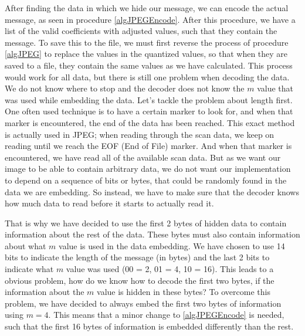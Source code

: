 After finding the data in which we hide our message, we can encode the actual message, as seen in procedure \ref{algJPEGEncode}. 
After this procedure, we have a list of the valid coefficients with adjusted values, such that they contain the message. 
To save this to the file, we must first reverse the process of procedure \ref{algJPEG} to replace the values in the quantized values, so that when they are saved to a file, they contain the same values as we have calculated. 
This process would work for all data, but there is still one problem when decoding the data. We do not know where to stop and the decoder does not know the $m$ value that was used while embedding the data. 
Let's tackle the problem about length first. 
One often used technique is to have a certain marker to look for, and when that marker is encountered, the end of the data has been reached. 
This exact method is actually used in JPEG; when reading through the scan data, we keep on reading until we reach the EOF (End of File) marker. 
And when that marker is encountered, we have read all of the available scan data. 
But as we want our image to be able to contain arbitrary data, we do not want our implementation to depend on a sequence of bits or bytes, that could be randomly found in the data we are embedding. 
So instead, we have to make sure that the decoder knows how much data to read before it starts to actually read it. 

That is why we have decided to use the first 2 bytes of hidden data to contain information about the rest of the data. 
These bytes must also contain information about what $m$ value is used in the data embedding. 
We have chosen to use 14 bits to indicate the length of the message (in bytes) and the last 2 bits to indicate what $m$ value was used (00 = 2, 01 = 4, 10 = 16). 
This leads to a obvious problem, how do we know how to decode the first two bytes, if the information about the $m$ value is hidden in these bytes? To overcome this problem, we have decided to always embed the first two bytes of information using $m = 4$. 
This means that a minor change to \ref{algJPEGEncode} is needed, such that the first 16 bytes of information is embedded differently than the rest.

